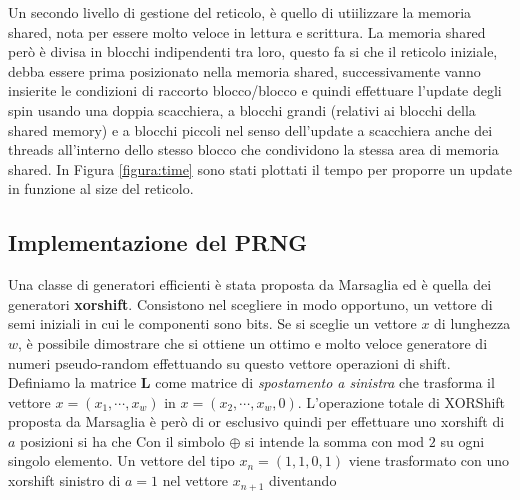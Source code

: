 \documentclass[a4paper,12pt]{article}
\begin{document}
Un secondo livello di gestione del reticolo, è quello di utiilizzare la memoria shared, nota per essere molto veloce in lettura e scrittura. La memoria shared però è divisa in blocchi indipendenti tra loro, questo fa si che il reticolo iniziale, debba essere prima posizionato nella memoria shared, successivamente vanno insierite le condizioni di raccorto blocco/blocco e quindi effettuare l'update degli spin usando una doppia scacchiera, a blocchi grandi (relativi ai blocchi della shared memory) e a blocchi piccoli nel senso dell'update a scacchiera anche dei threads all'interno dello stesso blocco che condividono la stessa area di memoria shared. In Figura \ref{figura:time} sono stati plottati il tempo per proporre un update in funzione al size del reticolo.



\subsection{Implementazione del PRNG}
Una classe di generatori efficienti è stata proposta da Marsaglia ed è quella dei generatori \textbf{xorshift}. Consistono nel scegliere in modo opportuno, un vettore di semi iniziali in cui le componenti sono bits. Se si sceglie un vettore $x$ di lunghezza $w$, è possibile dimostrare che si ottiene un ottimo e molto veloce generatore di numeri pseudo-random effettuando su questo vettore operazioni di shift. Definiamo la matrice $\mathbf{L}$
come matrice di \textit{spostamento a sinistra} che trasforma il vettore $x=(x_1,\cdots,x_w)$ in $x=(x_2,\cdots,x_w,0)$. L'operazione totale di XORShift proposta da Marsaglia è però di or esclusivo quindi per effettuare uno xorshift di $a$ posizioni si ha che
Con il simbolo $\oplus$ si intende la somma con mod $2$ su ogni singolo elemento. Un vettore del tipo $x_{n}=(1,1,0,1)$ viene trasformato con uno xorshift sinistro di $a=1$ nel vettore $x_{n+1}$ diventando
\end{document}
